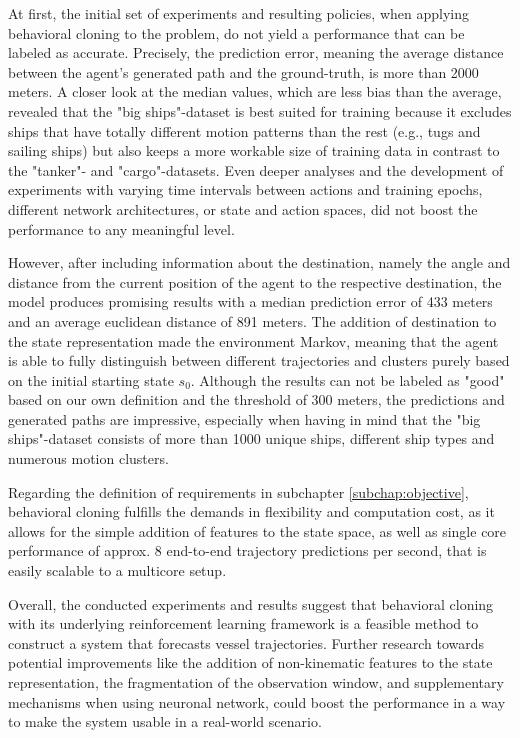 \newpage
At first, the initial set of experiments and resulting policies, when applying behavioral cloning to the problem, do not yield a performance that can be labeled as accurate. Precisely, the prediction error, meaning the average distance between the agent's generated path and the ground-truth, is more than 2000 meters. A closer look at the median values, which are less bias than the average, revealed that the "big ships"-dataset is best suited for training because it excludes ships that have totally different motion patterns than the rest (e.g., tugs and sailing ships) but also keeps a more workable size of training data in contrast to the "tanker"- and "cargo"-datasets. Even deeper analyses and the development of experiments with varying time intervals between actions and training epochs, different network architectures, or state and action spaces, did not boost the performance to any meaningful level. 
\par
However, after including information about the destination, namely the angle and distance from the current position of the agent to the respective destination, the model produces promising results with a median prediction error of 433 meters and an average euclidean distance of 891 meters. The addition of destination to the state representation made the environment Markov, meaning that the agent is able to fully distinguish between different trajectories and clusters purely based on the initial starting state $s_0$. Although the results can not be labeled as "good" based on our own definition and the threshold of 300 meters, the predictions and generated paths are impressive, especially when having in mind that the "big ships"-dataset consists of more than 1000 unique ships, different ship types and numerous motion clusters.
\par
Regarding the definition of requirements in subchapter \ref{subchap:objective}, behavioral cloning fulfills the demands in flexibility and computation cost, as it allows for the simple addition of features to the state space, as well as single core performance of approx. 8 end-to-end trajectory predictions per second, that is easily scalable to a multicore setup.
\par
Overall, the conducted experiments and results suggest that behavioral cloning with its underlying reinforcement learning framework is a feasible method to construct a system that forecasts vessel trajectories. Further research towards potential improvements like the addition of non-kinematic features to the state representation, the fragmentation of the observation window, and supplementary mechanisms when using neuronal network, could boost the performance in a way to make the system usable in a real-world scenario.